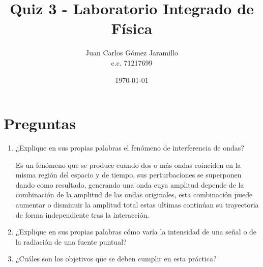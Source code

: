 \documentclass{article}
\title{Quiz 3 - Laboratorio Integrado de Física}
\author{Juan Carlos Gómez Jaramillo \\c.c. 71217699}
\date{\today}
\begin{document}
	
	\maketitle
	
	\section{Preguntas}
	\begin{enumerate}
		\item ¿Explique en sus propias palabras el fenómeno de interferencia de ondas? 
		
		\vspace{0.3cm}
		
		Es un fenómeno que se produce cuando dos o más ondas coinciden en la misma región del espacio y de tiempo, sus perturbaciones se superponen dando como resultado, generando una onda  cuya amplitud depende de la combinación de la amplitud de las ondas originales, esta combinación puede aumentar o disminuir la amplitud total estas ultimas continúan su trayectoria de forma independiente tras la interacción. 
		
		\vspace{0.3cm}
		
		\item ¿Explique en sus propias palabras cómo varía la intensidad de una señal o de la radiación de una fuente puntual?
		
		\vspace{0.3cm}
		
		\vspace{0.3cm}
		
		\item ¿Cuáles son los objetivos que se deben cumplir en esta práctica?
		
		\vspace{0.3cm}
		

\end{enumerate}
\end{document}
